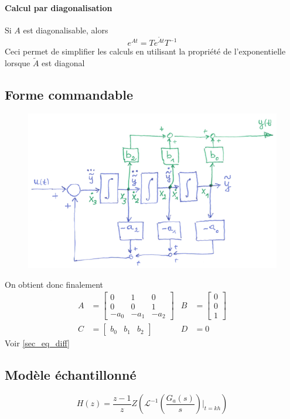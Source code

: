 \documentclass[resume]{subfiles}
\begin{document}
\paragraph{Calcul par diagonalisation}
Si $A$ est diagonalisable, alors
$$\boxed{e^{At}=Te^{\tilde{A}t}T^{-1}}$$
Ceci permet de simplifier les calculs en utilisant la propriété de l'exponentielle lorsque $\tilde{A}$ est diagonal

\subsection{Forme commandable}
\begin{figure}[H]
\centering
\includegraphics[width=\columnwidth]{img_0.png}
\end{figure}
On obtient donc finalement
$$\boxed{\begin{split}
A&= \begin{bmatrix}0 & 1 & 0\\0 & 0 & 1\\-a_0 & -a_1 & -a_2\end{bmatrix} & B&=\begin{bmatrix}0\\0\\1\end{bmatrix}\\
C&=\begin{bmatrix}b_0 & b_1 & b_2\end{bmatrix} & D&=0
\end{split}}$$
Voir \ref{sec_eq_diff}

\subsection{Modèle échantillonné}
$$\boxed{H(z)=\frac{z-1}{z}Z\left(\mathcal{L}^{-1}\left(\frac{G_a(s)}{s}\right)\Big|_{t=kh}\right)}$$
\end{document}
